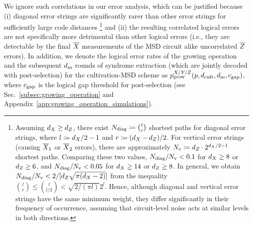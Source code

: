 \documentclass[
 prx,
 reprint,
 superscriptaddress,
 longbibliography,
 dvipsnames
]{revtex4-2}
\begin{document}
We ignore such correlations in our error analysis, which can be justified because (i) diagonal error strings are significantly rarer than other error strings for sufficiently large code distances \footnote{
    Assuming ${d_X} \geq {d_Z}$, there exist $N_{\mathrm{diag}} \coloneqq \binom{l}{r}$ shortest paths for diagonal error strings, where $l \coloneqq {d_X}/2 - 1$ and $r \coloneqq ({d_X} - {d_Z}) / 2$.
    For vertical error strings (causing $\overline{X}_1$ or $\overline{X}_2$ errors), there are approximately $N_{\mathrm{v}} \coloneqq {d_Z} \cdot 2^{{d_X}/2-1}$ shortest paths.
    Comparing these two values, $N_{\mathrm{diag}} / N_{\mathrm{v}} < 0.1$ for ${d_X} \geq 8$ or ${d_Z} \geq 6$, and $N_{\mathrm{diag}} / N_{\mathrm{v}} < 0.05$ for ${d_X} \geq 14$ or ${d_Z} \geq 8$.
    In general, we obtain $N_{\mathrm{diag}}/N_{\mathrm{v}} < 2/[{d_Z} \sqrt{\pi({d_X} - 2)}]$ from the inequality $\binom{l}{r} \leq \binom{l}{l/2} < \sqrt{2/(\pi l)} 2^l$.
    Hence, although diagonal and vertical error strings have the same minimum weight, they differ significantly in their frequency of occurrence, assuming that circuit-level noise acts at similar levels in both directions.
} and (ii) the resulting correlated logical errors are not specifically more detrimental than other logical errors (i.e., they are detectable by the final $\overline{X}$ measurements of the MSD circuit alike uncorrelated $\overline{Z}$ errors).
In addition, we denote the logical error rates of the growing operation and the subsequent $d_{\mathrm{m}}$ rounds of syndrome extraction (which are jointly decoded with post-selection) for the cultivation-MSD scheme as $p_{\mathrm{grow}}^{X/Y/Z}(p, d_\mathrm{cult}, d_{\mathrm{m}}, c_{\mathrm{gap}})$, where $c_{\mathrm{gap}}$ is the logical gap threshold for post-selection (see Sec.~\ref{subsec:growing_operation} and Appendix~\ref{app:growing_operation_simulations}).
\end{document}
